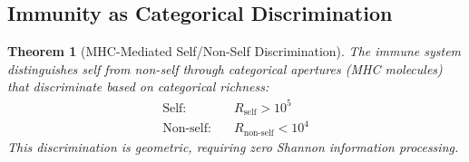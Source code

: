 \documentclass[12pt,a4paper]{article}
\newtheorem{theorem}{Theorem}
\begin{document}
\subsection{Immunity as Categorical Discrimination}

\begin{theorem}[MHC-Mediated Self/Non-Self Discrimination]
The immune system distinguishes self from non-self through categorical apertures (MHC molecules) that discriminate based on categorical richness:
\begin{align}
\text{Self:} \quad &R_{\text{self}} > 10^5 \\
\text{Non-self:} \quad &R_{\text{non-self}} < 10^4
\end{align}
This discrimination is geometric, requiring zero Shannon information processing.
\end{theorem}
\end{document}
